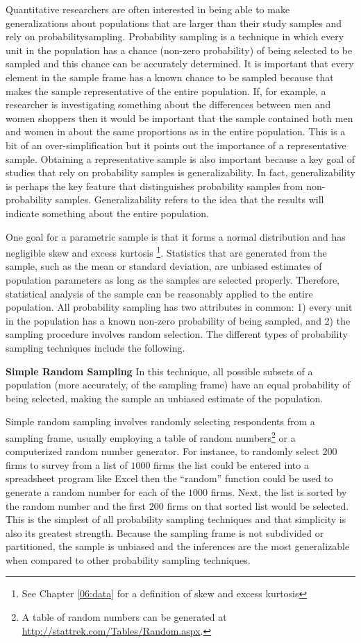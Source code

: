 Quantitative researchers are often interested in being able to make generalizations about populations that are larger than their study samples and rely on \gls{probabilitysampling}. Probability sampling is a technique in which every unit in the population has a chance (non-zero probability) of being selected to be sampled and this chance can be accurately determined. It is important that every element in the sample frame has a known chance to be sampled because that makes the sample representative of the entire population. If, for example, a researcher is investigating something about the differences between men and women shoppers then it would be important that the sample contained both men and women in about the same proportions as in the entire population. This is a bit of an over-simplification but it points out the importance of a representative sample. Obtaining a representative sample is also important because a key goal of studies that rely on probability samples is generalizability. In fact, generalizability is perhaps the key feature that distinguishes probability samples from non-probability samples. Generalizability refers to the idea that the results will indicate something about the entire population.

One goal for a parametric sample is that it forms a normal distribution and has negligible skew and excess kurtosis \footnote{See Chapter \ref{06:data} for a definition of skew and excess kurtosis}. Statistics that are generated from the sample, such as the mean or standard deviation, are unbiased estimates of population parameters as long as the samples are selected properly. Therefore, statistical analysis of the sample can be reasonably applied to the entire population. All probability sampling has two attributes in common: 1) every unit in the population has a known non-zero probability of being sampled, and 2) the sampling procedure involves random selection. The different types of probability sampling techniques include the following.

\textbf{Simple Random Sampling} In this technique, all possible subsets of a population (more accurately, of the sampling frame) have an equal probability of being selected, making the sample an unbiased estimate of the population. 

Simple random sampling involves randomly selecting respondents from a sampling frame, usually employing a table of random numbers\footnote{A table of random numbers can be generated at \url{http://stattrek.com/Tables/Random.aspx}.} or a computerized random number generator. For instance, to randomly select $ 200 $ firms to survey from a list of $ 1000 $ firms the list could be entered into a spreadsheet program like Excel then the ``random'' function could be used to generate a random number for each of the $ 1000 $ firms. Next, the list is sorted by the random number and the first $ 200 $ firms on that sorted list would be selected. This is the simplest of all probability sampling techniques and that simplicity is also its greatest strength. Because the sampling frame is not subdivided or partitioned, the sample is unbiased and the inferences are the most generalizable when compared to other probability sampling techniques.

